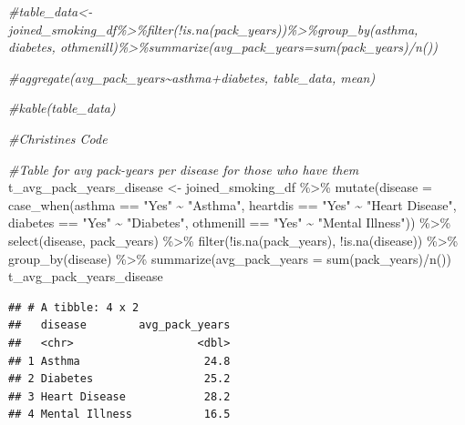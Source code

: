 \documentclass[
]{article}
\newenvironment{Shaded}{\begin{snugshade}}{\end{snugshade}}
\newcommand{\AttributeTok}[1]{\textcolor[rgb]{0.77,0.63,0.00}{#1}}
\newcommand{\CommentTok}[1]{\textcolor[rgb]{0.56,0.35,0.01}{\textit{#1}}}
\newcommand{\FunctionTok}[1]{\textcolor[rgb]{0.00,0.00,0.00}{#1}}
\newcommand{\NormalTok}[1]{#1}
\newcommand{\OtherTok}[1]{\textcolor[rgb]{0.56,0.35,0.01}{#1}}
\newcommand{\SpecialCharTok}[1]{\textcolor[rgb]{0.00,0.00,0.00}{#1}}
\newcommand{\StringTok}[1]{\textcolor[rgb]{0.31,0.60,0.02}{#1}}
\begin{document}
\begin{Shaded}
\begin{Highlighting}[]
\CommentTok{\#table\_data\textless{}{-}joined\_smoking\_df\%\textgreater{}\%filter(!is.na(pack\_years))\%\textgreater{}\%group\_by(asthma, diabetes, othmenill)\%\textgreater{}\%summarize(avg\_pack\_years=sum(pack\_years)/n())}

\CommentTok{\#aggregate(avg\_pack\_years\textasciitilde{}asthma+diabetes, table\_data, mean)}

\CommentTok{\#kable(table\_data)}


\CommentTok{\#Christine\textquotesingle{}s Code}

\CommentTok{\#Table for avg pack{-}years per disease for those who have them}
\NormalTok{t\_avg\_pack\_years\_disease }\OtherTok{\textless{}{-}}\NormalTok{ joined\_smoking\_df }\SpecialCharTok{\%\textgreater{}\%}
  \FunctionTok{mutate}\NormalTok{(}\AttributeTok{disease =} \FunctionTok{case\_when}\NormalTok{(asthma }\SpecialCharTok{==} \StringTok{"Yes"} \SpecialCharTok{\textasciitilde{}} \StringTok{"Asthma"}\NormalTok{,}
\NormalTok{                            heartdis }\SpecialCharTok{==} \StringTok{"Yes"} \SpecialCharTok{\textasciitilde{}} \StringTok{"Heart Disease"}\NormalTok{,}
\NormalTok{                            diabetes }\SpecialCharTok{==} \StringTok{"Yes"} \SpecialCharTok{\textasciitilde{}} \StringTok{"Diabetes"}\NormalTok{,}
\NormalTok{                            othmenill }\SpecialCharTok{==} \StringTok{"Yes"} \SpecialCharTok{\textasciitilde{}} \StringTok{"Mental Illness"}\NormalTok{)) }\SpecialCharTok{\%\textgreater{}\%}
  \FunctionTok{select}\NormalTok{(disease, pack\_years) }\SpecialCharTok{\%\textgreater{}\%}
  \FunctionTok{filter}\NormalTok{(}\SpecialCharTok{!}\FunctionTok{is.na}\NormalTok{(pack\_years), }\SpecialCharTok{!}\FunctionTok{is.na}\NormalTok{(disease)) }\SpecialCharTok{\%\textgreater{}\%}
  \FunctionTok{group\_by}\NormalTok{(disease) }\SpecialCharTok{\%\textgreater{}\%}
  \FunctionTok{summarize}\NormalTok{(}\AttributeTok{avg\_pack\_years =} \FunctionTok{sum}\NormalTok{(pack\_years)}\SpecialCharTok{/}\FunctionTok{n}\NormalTok{())}
\NormalTok{t\_avg\_pack\_years\_disease}
\end{Highlighting}
\end{Shaded}

\begin{verbatim}
## # A tibble: 4 x 2
##   disease        avg_pack_years
##   <chr>                   <dbl>
## 1 Asthma                   24.8
## 2 Diabetes                 25.2
## 3 Heart Disease            28.2
## 4 Mental Illness           16.5
\end{verbatim}
\end{document}
